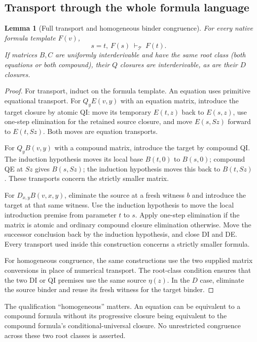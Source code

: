\documentclass[11pt,a4paper]{article}
\newtheorem{lemma}[theorem]{Lemma}
\theoremstyle{definition}\newtheorem{definition}[theorem]{Definition}
\begin{document}
\subsection{Transport through the whole formula language}
\label{target:full-transport-section}

\begin{lemma}[Full transport and homogeneous binder congruence]
\label{target:full-transport}
For every native formula template $F(v)$,
\[
 s=t,\ F(s)\ \vdash_{\mathcal T}\ F(t).
\]
If matrices $B,C$ are uniformly interderivable and have the same root class
(both equations or both compound), their $Q$ closures are interderivable,
as are their $D$ closures.
\end{lemma}
\begin{proof}
For transport, induct on the formula template.  An equation uses primitive
equational transport.  For $Q_yE(v,y)$ with an equation matrix, introduce
the target closure by atomic QI: move its temporary $E(t,z)$ back to
$E(s,z)$, use one-step elimination for the retained source closure, and
move $E(s,Sz)$ forward to $E(t,Sz)$.  Both moves are equation transports.

For $Q_yB(v,y)$ with a compound matrix, introduce the target by compound
QI.  The induction hypothesis moves its local base $B(t,0)$ to $B(s,0)$;
compound QE at $Sz$ gives $B(s,Sz)$; the induction hypothesis moves this
back to $B(t,Sz)$.  These transports concern the strictly smaller matrix.

For $D_{x,y}B(v,x,y)$, eliminate the source at a fresh witness $b$ and
introduce the target at that same witness.  Use the induction hypothesis
to move the local introduction premise from parameter $t$ to $s$.  Apply
one-step elimination if the matrix is atomic and ordinary compound closure
elimination otherwise.  Move the successor conclusion back by the induction
hypothesis, and close DI and DE.  Every transport used inside this
construction concerns a strictly smaller formula.

For homogeneous congruence, the same constructions use the two supplied
matrix conversions in place of numerical transport.  The root-class
condition ensures that the two DI or QI premises use the same source
$\eta(z)$.  In the $D$ case, eliminate the source binder and reuse its fresh
witness for the target binder.
\end{proof}

The qualification ``homogeneous'' matters.  An equation can be equivalent
to a compound formula without its progressive closure being equivalent to
the compound formula's conditional-universal closure.  No unrestricted
congruence across these two root classes is asserted.
\end{document}
